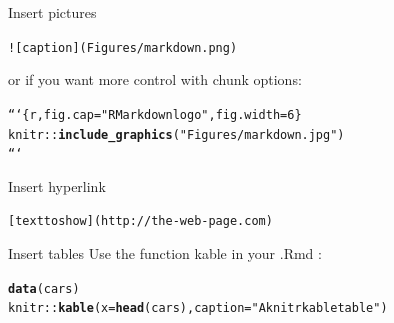 \documentclass[10pt]{beamer}\usepackage[]{graphicx}\usepackage[]{color}
\makeatletter
\newcommand{\hlstr}[1]{\textcolor[rgb]{0.192,0.494,0.8}{#1}}%
\newcommand{\hlopt}[1]{\textcolor[rgb]{0,0,0}{#1}}%
\newcommand{\hlstd}[1]{\textcolor[rgb]{0.345,0.345,0.345}{#1}}%
\newcommand{\hlkwc}[1]{\textcolor[rgb]{0.333,0.667,0.333}{#1}}%
\newcommand{\hlkwd}[1]{\textcolor[rgb]{0.737,0.353,0.396}{\textbf{#1}}}%
\newenvironment{kframe}{%
 \def\at@end@of@kframe{}%
 \ifinner\ifhmode%
  \def\at@end@of@kframe{\end{minipage}}%
  \begin{minipage}{\columnwidth}%
 \fi\fi%
 \def\FrameCommand##1{\hskip\@totalleftmargin \hskip-\fboxsep
 \colorbox{shadecolor}{##1}\hskip-\fboxsep
     \hskip-\linewidth \hskip-\@totalleftmargin \hskip\columnwidth}%
 \MakeFramed {\advance\hsize-\width
   \@totalleftmargin\z@ \linewidth\hsize
   \@setminipage}}%
 {\par\unskip\endMakeFramed%
 \at@end@of@kframe}
\newenvironment{knitrout}{}{} %
\makeatother
\begin{document}
\begin{frame}[fragile]{Insert pictures}

\begin{knitrout}\small
{}\color{fgcolor}\begin{kframe}
\begin{alltt}
![caption](Figures/markdown.png)
\end{alltt}
\end{kframe}
\end{knitrout}

or if you want more control with chunk options:

\begin{knitrout}\small
{}\color{fgcolor}\begin{kframe}
\begin{alltt}
```\{r, fig.cap=\hlstr{"R Markdown logo"}, fig.width=6\}
knitr::\hlkwd{include_graphics}(\hlstr{"Figures/markdown.jpg"})
```
\end{alltt}
\end{kframe}
\end{knitrout}


\end{frame}

\begin{frame}[fragile]{Insert hyperlink}
\begin{knitrout}\small
{}\color{fgcolor}\begin{kframe}
\begin{alltt}
[text to show](http://the-web-page.com)
\end{alltt}
\end{kframe}
\end{knitrout}
\end{frame}


\begin{frame}[fragile]{Insert tables}
Use the function kable in your .Rmd :

\begin{knitrout}\small
{}\color{fgcolor}\begin{kframe}
\begin{alltt}
\hlkwd{data}\hlstd{(cars)}
\hlstd{knitr}\hlopt{::}\hlkwd{kable}\hlstd{(}\hlkwc{x} \hlstd{=} \hlkwd{head}\hlstd{(cars),} \hlkwc{caption} \hlstd{=} \hlstr{"A knitr kable table"}\hlstd{)}
\end{alltt}
\end{kframe}
\end{knitrout}
\end{frame}
\end{document}
